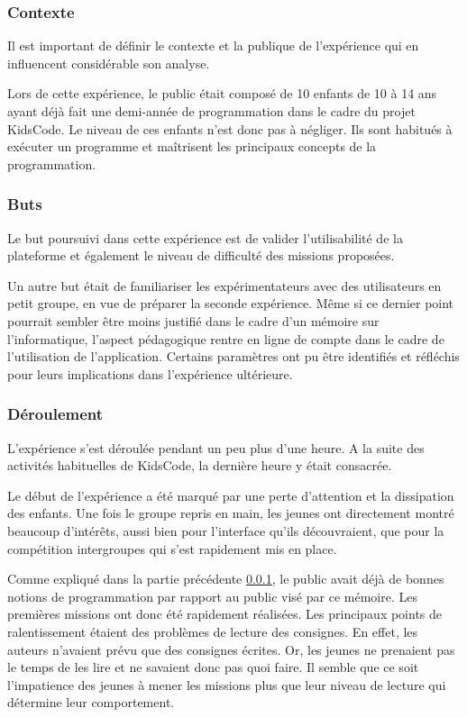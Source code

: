 \subsubsection{Contexte}
\label{context-kidscode}
Il est important de définir le contexte et la publique de l'expérience qui en influencent considérable son analyse.

Lors de cette expérience, le public était composé de 10 enfants de 10 à 14 ans ayant déjà fait une demi-année de programmation dans le cadre du projet KidsCode. Le niveau de ces enfants n'est donc pas à négliger. Ils sont habitués à exécuter un programme et maîtrisent les principaux concepts de la programmation.

\subsubsection{Buts}
Le but poursuivi dans cette expérience est de valider l'utilisabilité de la plateforme et également le niveau de difficulté des missions proposées.

Un autre but était de familiariser les expérimentateurs avec des utilisateurs en petit groupe, en vue de préparer la seconde expérience.
Même si ce dernier point pourrait sembler être moins justifié dans le cadre d'un mémoire sur l'informatique, l'aspect pédagogique rentre en ligne de compte dans le cadre de l'utilisation de l'application. Certains paramètres ont pu être identifiés et réfléchis pour leurs implications dans l'expérience ultérieure.

\subsubsection{Déroulement}
L'expérience s'est déroulée pendant un peu plus d'une heure. A la suite des activités habituelles de KidsCode, la dernière heure y était consacrée.

Le début de l'expérience a été marqué par une perte d'attention et la dissipation des enfants. Une fois le groupe repris en main, les jeunes ont directement montré beaucoup d'intérêts, aussi bien pour l'interface qu'ils découvraient, que pour la compétition intergroupes qui s'est rapidement mis en place.

Comme expliqué dans la partie précédente \ref{context-kidscode}, le public avait déjà de bonnes notions de programmation par rapport au public visé par ce mémoire. Les premières missions ont donc été rapidement réalisées. Les principaux points de ralentissement étaient des problèmes de lecture des consignes. En effet, les auteurs n'avaient prévu que des consignes écrites. Or, les jeunes ne prenaient pas le temps de les lire et ne savaient donc pas quoi faire. Il semble que ce soit l'impatience des jeunes à mener les missions plus que leur niveau de lecture qui détermine leur comportement.

